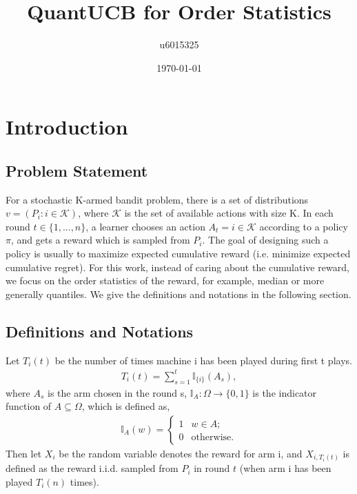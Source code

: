 \documentclass{article}
\title{QuantUCB for Order Statistics}
\author{u6015325 }
\date{\today}
\theoremstyle{plain}
\begin{document}
\maketitle

\section{Introduction}

\subsection{Problem Statement}

    For a stochastic K-armed bandit problem, there is a set of distributions $v = (P_i: i \in \mathcal{K})$, where $\mathcal{K}$ is the set of available actions with size K. In each round $t \in \{1, ..., n\}$, a learner chooses an action $A_t = i \in \mathcal{K}$ according to a policy $\pi$, and gets a reward which is sampled from $P_i$. The goal of designing such a policy is usually to maximize expected cumulative reward (i.e. minimize expected cumulative regret). For this work, instead of caring about the cumulative reward, we focus on the order statistics of the reward, for example, median or more generally quantiles. We give the definitions and notations in the following section.

\subsection{Definitions and Notations}

    Let $T_i(t)$ be the number of times machine i has been played during first t plays.
    \begin{align}
        T_i(t) = \sum_{s = 1}^t \mathbb{I}_{\{i\}} (A_s),
    \end{align}
    where $A_s$ is the arm chosen in the round s, $\mathbb{I}_A: \Omega\rightarrow \{0,1\}$ is the indicator function of $A \subseteq \Omega$, which is defined as,
    \begin{align}
        \mathbb{I}_A(w) = \begin{cases}
                            1 & w \in A;\\
                            0 & \text{otherwise}.
                            \end{cases}
    \end{align}
    Then let $X_i$ be the random variable denotes the reward for arm i, and $X_{i,T_i(t)}$ is defined as the reward i.i.d. sampled from $P_i$ in round $t$ (when arm i has been played $T_i(n)$ times). \\
\end{document}
